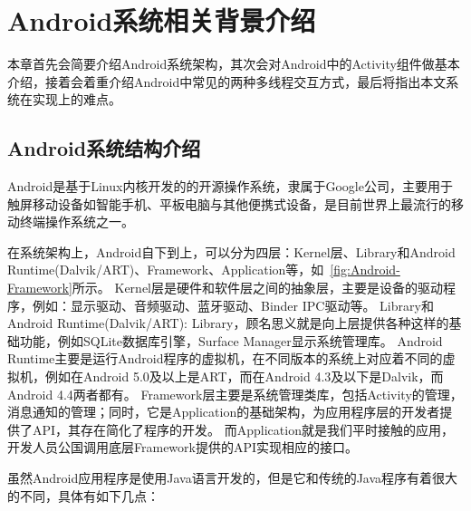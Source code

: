 \chapter{Android系统相关背景介绍 }  
\label{ch2}


本章首先会简要介绍Android系统架构，其次会对Android中的Activity组件做基本介绍，接着会着重介绍Android中常见的两种多线程交互方式，最后将指出本文系统在实现上的难点。

\section{Android系统结构介绍}

Android是基于Linux内核开发的的开源操作系统，隶属于Google公司，主要用于触屏移动设备如智能手机、平板电脑与其他便携式设备，是目前世界上最流行的移动终端操作系统之一。

在系统架构上，Android自下到上，可以分为四层：Kernel层、Library和Android Runtime(Dalvik/ART)、Framework、Application等，如~\autoref{fig:Android-Framework}所示。
Kernel层是硬件和软件层之间的抽象层，主要是设备的驱动程序，例如：显示驱动、音频驱动、蓝牙驱动、Binder IPC驱动等。
Library和Android Runtime(Dalvik/ART): Library，顾名思义就是向上层提供各种这样的基础功能，例如SQLite数据库引擎，Surface Manager显示系统管理库。
Android Runtime主要是运行Android程序的虚拟机，在不同版本的系统上对应着不同的虚拟机，例如在Android 5.0及以上是ART，而在Android 4.3及以下是Dalvik，而Android 4.4两者都有。
Framework层主要是系统管理类库，包括Activity的管理，消息通知的管理；同时，它是Application的基础架构，为应用程序层的开发者提供了API，其存在简化了程序的开发。
而Application就是我们平时接触的应用，开发人员公国调用底层Framework提供的API实现相应的接口。

虽然Android应用程序是使用Java语言开发的，但是它和传统的Java程序有着很大的不同，具体有如下几点：

